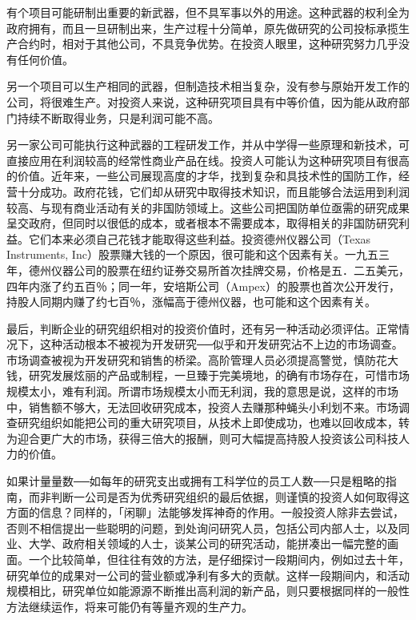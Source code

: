 \documentclass[UTF8,a4paper,zihao=-4,fontset = windows]{ctexart} %
\begin{document}
有个项目可能研制出重要的新武器，但不具军事以外的用途。这种武器的权利全为政府拥有，而且一旦研制出来，生产过程十分简单，原先做研究的公司投标承揽生产合约时，相对于其他公司，不具竞争优势。在投资人眼里，这种研究努力几乎没有任何价值。

另一个项目可以生产相同的武器，但制造技术相当复杂，没有参与原始开发工作的公司，将很难生产。对投资人来说，这种研究项目具有中等价值，因为能从政府部门持续不断取得业务，只是利润可能不高。

另一家公司可能执行这种武器的工程研发工作，并从中学得一些原理和新技术，可直接应用在利润较高的经常性商业产品在线。投资人可能认为这种研究项目有很高的价值。近年来，一些公司展现高度的才华，找到复杂和具技术性的国防工作，经营十分成功。政府花钱，它们却从研究中取得技术知识，而且能够合法运用到利润较高、与现有商业活动有关的非国防领域上。这些公司把国防单位亟需的研究成果呈交政府，但同时以很低的成本，或者根本不需要成本，取得相关的非国防研究利益。它们本来必须自己花钱才能取得这些利益。投资德州仪器公司（Texas Instruments, Inc）股票赚大钱的一个原因，很可能和这个因素有关。一九五三年，德州仪器公司的股票在纽约证券交易所首次挂牌交易，价格是五．二五美元，四年内涨了约五百％；同一年，安培斯公司（Ampex）的股票也首次公开发行，持股人同期内赚了约七百％，涨幅高于德州仪器，也可能和这个因素有关。

最后，判断企业的研究组织相对的投资价值时，还有另一种活动必须评估。正常情况下，这种活动根本不被视为开发研究──似乎和开发研究沾不上边的市场调查。市场调查被视为开发研究和销售的桥梁。高阶管理人员必须提高警觉，慎防花大钱，研究发展炫丽的产品或制程，一旦臻于完美境地，的确有市场存在，可惜市场规模太小，难有利润。所谓市场规模太小而无利润，我的意思是说，这样的市场中，销售额不够大，无法回收研究成本，投资人去赚那种蝇头小利划不来。市场调查研究组织如能把公司的重大研究项目，从技术上即使成功，也难以回收成本，转为迎合更广大的市场，获得三倍大的报酬，则可大幅提高持股人投资该公司科技人力的价值。

如果计量量数──如每年的研究支出或拥有工科学位的员工人数──只是粗略的指南，而非判断一公司是否为优秀研究组织的最后依据，则谨慎的投资人如何取得这方面的信息？同样的，「闲聊」法能够发挥神奇的作用。一般投资人除非去尝试，否则不相信提出一些聪明的问题，到处询问研究人员，包括公司内部人士，以及同业、大学、政府相关领域的人士，谈某公司的研究活动，能拼凑出一幅完整的画面。一个比较简单，但往往有效的方法，是仔细探讨一段期间内，例如过去十年，研究单位的成果对一公司的营业额或净利有多大的贡献。这样一段期间内，和活动规模相比，研究单位如能源源不断推出高利润的新产品，则只要根据同样的一般性方法继续运作，将来可能仍有等量齐观的生产力。
\\
\end{document}
